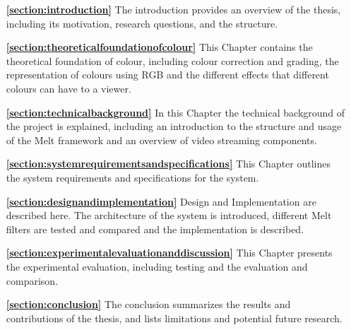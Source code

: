 \documentclass[../MasterThesis.tex]{subfiles}
\begin{document}
	
	\begin{itemize}
		
		\item[\textbf{\ref{section:introduction}}] The introduction provides an overview of the thesis, including its motivation, research questions, and the structure.
		
		\item[\textbf{\ref{section:theoreticalfoundationofcolour}}] This Chapter contains the theoretical foundation of colour, including colour correction and grading, the representation of colours using RGB and the different effects that different colours can have to a viewer.
		
		\item[\textbf{\ref{section:technicalbackground}}] In this Chapter the technical background of the project is explained, including an introduction to the structure and usage of the Melt framework and an overview of video streaming components.
		
		\item[\textbf{\ref{section:systemrequirementsandspecifications}}] This Chapter outlines the system requirements and specifications for the system.
		
		\item[\textbf{\ref{section:designandimplementation}}] Design and Implementation are described here. The architecture of the system is introduced, different Melt filters are tested and compared and the implementation is described.
		
		\item[\textbf{\ref{section:experimentalevaluationanddiscussion}}] This Chapter presents the experimental evaluation, including testing and the evaluation and comparison.
		
		\item[\textbf{\ref{section:conclusion}}] The conclusion summarizes the results and contributions of the thesis, and lists limitations and potential future research.
		
	\end{itemize}

	
	
	

	
	

	
	
	
\end{document}
